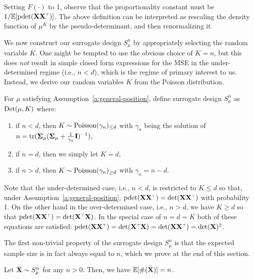 \documentclass[11pt]{article}
\begin{document}
\noindent
Setting $F(\cdot)$ to 1, observe that the proportionality constant
must be $1/\E[\pdet(\X\X^\top)]$. The above definition can be
interpreted as rescaling the density function of $\mu^K$ by the
pseudo-determinant, and then renormalizing it.

We now construct our surrogate design $S_\mu^n$ by appropriately
selecting the random variable $K$. 
One might be tempted to use the obvious choice of $K=n$, but this does \emph{not} result in simple closed form expressions for the MSE in the under-determined regime (i.e., $n<d$), which is the regime of primary interest to us. 
Instead, we derive our random variables $K$ from the Poisson distribution.

\begin{definition}\label{d:surrogate}
For $\mu$ satisfying Assumption~\ref{a:general-position},
define surrogate design $S_\mu^n$ as ${\mathrm{Det}}(\mu,K)$ where: 
    \begin{enumerate}
\item if $n<d$, then $K\sim {\operatorname{Poisson}}(\gamma_n)_{\leq d}$ with
 $\gamma_n$ being the solution of $n=\mathrm{tr}(\mathbf{\Sigma}_\mu(\mathbf{\Sigma}_\mu+\frac1{\gamma_n}\mathbf I)^{-1})$, 
\item if $n=d$, then we simply let $K=d$,
\item if $n>d$, then $K\sim{\operatorname{Poisson}}(\gamma_n)_{\geq d}$ with $\gamma_n=n-d$.
\end{enumerate}
\end{definition}

\noindent
Note that the under-determined case, i.e., $n<d$, is restricted to $K\leq d$ so that, under Assumption~\ref{a:general-position}, $\pdet(\X\X^\top)=\det(\X\X^\top)$ with probability 1. 
On the other hand in the over-determined case, i.e., $n>d$, we have
$K\geq d$ so that $\pdet(\X\X^\top)=\det(\X^\top\X)$. In the special case
of $n=d=K$ both of these equations are satisfied: $\pdet(\X\X^\top)=\det(\X^\top\X)=\det(\X\X^\top)=\det(\X)^2$.

The first non-trivial property of the surrogate design $S_\mu^n$ is
that the expected sample size is in fact always equal to $n$, which we
prove at the end of this section.
\begin{lemma} \label{l:size}
Let ${\bar{\mathbf X}}\sim S_\mu^n$ for any $n>0$. 
 Then, we have $\mathbb E[\#({\bar{\mathbf X}})] = n$.
\end{lemma}
\end{document}
